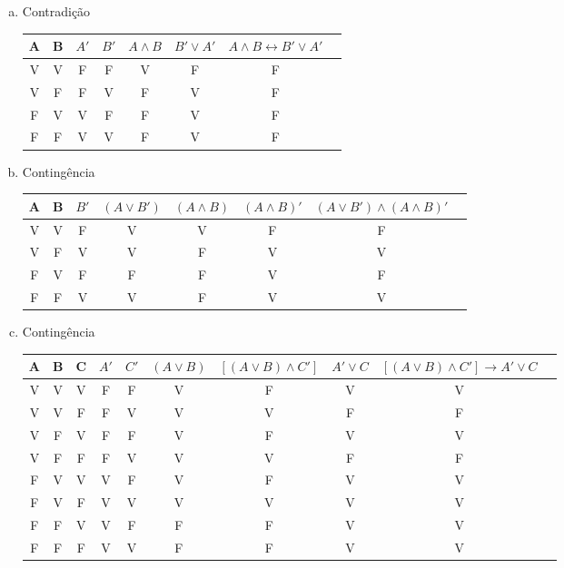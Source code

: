 \begin{Gabarito}{9}
\begin{enumerate}[a)]
      \item Contradição \\
      \begin{tabular}{|c|c|c|c|c|c|c|c|}
        \hline
        A & B & $A'$ & $B'$ & $A \land B$ & $B' \lor A'$ & $A \land B \leftrightarrow B' \lor A'$ \\
        \hline
        V & V & F & F & V & F & F \\
        V & F & F & V & F & V & F \\
        F & V & V & F & F & V & F \\
        F & F & V & V & F & V & F \\
        \hline
      \end{tabular}

      \item Contingência \\
      \begin{tabular}{|c|c|c|c|c|c|c|c|}
        \hline
        A & B & $B'$ & $(A \lor B')$ & $(A \land B)$ & $(A \land B)'$ & $(A \lor B') \land (A \land B)'$ \\
        \hline
        V & V & F & V & V & F & F \\
        V & F & V & V & F & V & V \\
        F & V & F & F & F & V & F \\
        F & F & V & V & F & V & V \\
        \hline
      \end{tabular}

      \item Contingência \\
      \begin{tabular}{|c|c|c|c|c|c|c|c|c|c|}
        \hline
        A & B & C & $A'$ & $C'$ & $(A \lor B)$ & $[(A \lor B) \land C']$ & $A' \lor C$ & $[(A \lor B) \land C'] \rightarrow A' \lor C$ \\
        \hline
        V & V & V & F & F & V & F & V & V \\
        V & V & F & F & V & V & V & F & F \\
        V & F & V & F & F & V & F & V & V \\
        V & F & F & F & V & V & V & F & F \\
        F & V & V & V & F & V & F & V & V \\
        F & V & F & V & V & V & V & V & V \\
        F & F & V & V & F & F & F & V & V \\
        F & F & F & V & V & F & F & V & V \\
        \hline
      \end{tabular}
    \end{enumerate}
  
\end{Gabarito}
